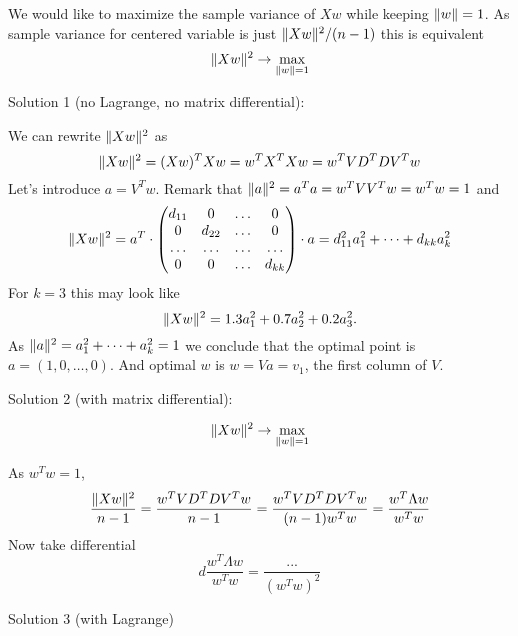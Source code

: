 \documentclass[12pt]{article}
\DeclarePairedDelimiter{\norm}{\lVert}{\rVert}
\begin{document}
We would like to maximize the sample variance of $Xw$ while keeping $\norm{w} = 1$.
As sample variance for centered variable is just $\norm{Xw}^2 / (n - 1)$
this is equivalent
\[
\norm{Xw}^2  \to \max_{\norm{w} = 1}
\]

Solution 1 (no Lagrange, no matrix differential):

We can rewrite $\norm{Xw}^2$ as
\[
\norm{Xw}^2 = (Xw)^T Xw = w^T X^T Xw = w^T VD^T DV^T w
\]
Let's introduce $a = V^T w$.
Remark that $\norm{a}^2 = a^T a = w^T VV^T w = w^T w = 1$ and
\[
    \norm{Xw}^2 = a^T \cdot \begin{pmatrix}
        d_{11} & 0 & \dots & 0 \\
        0  & d_{22} & \dots & 0 \\
        \dots & \dots & \dots & \dots \\
        0 & 0 & \dots & d_{kk} \\
    \end{pmatrix} \cdot a
    = d_{11}^2 a_1^2 + \dots + d_{kk} a_k^2
\]
For $k = 3$ this may look like
\[
    \norm{Xw}^2 = 1.3 a_1^2 + 0.7 a_2^2 + 0.2 a_3^2.
\]
As $\norm{a}^2 = a_1^2 + \dots + a_k^2 = 1$ we conclude that the optimal point is $a = (1, 0, \dots, 0)$. 
And optimal $w$ is $w = Va = v_1$, the first column of $V$.

Solution 2 (with matrix differential):

\[
\norm{Xw}^2  \to \max_{\norm{w} = 1}
\]

As $w^Tw = 1$,
\[
    \frac{\norm{Xw}^2}{n - 1} = \frac{w^T VD^T DV^T w}{n-1} = \frac{w^T VD^T DV^T w }{ (n - 1)w^Tw }   = \frac{w^T \Lambda w}{ w^T w}
\]
Now take differential 
\[
d \frac{w^T \Lambda w}{ w^T w} = \frac{...}{ (w^T w)^2}
\]

Solution 3 (with Lagrange)
\end{document}
